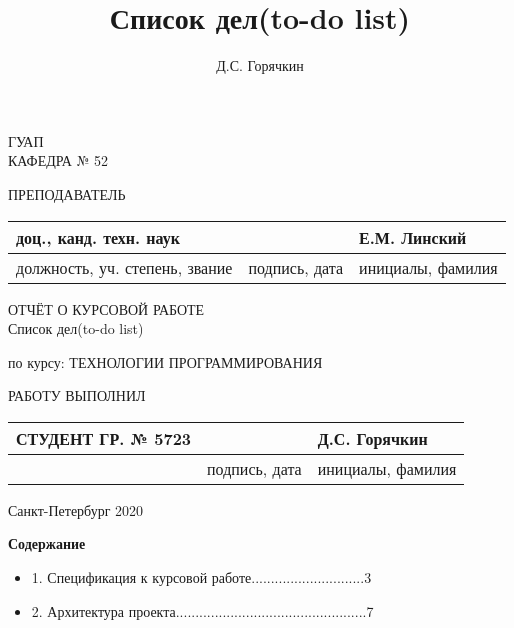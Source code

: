 \documentclass[a4paper,14pt]{extarticle} %
\author{Д.С. Горячкин}
\title{Список дел(to-do list)}
\begin{document}
 
\begin{titlepage} 
\begin{center} 

ГУАП\\ 
КАФЕДРА № 52\\ 
\vspace{2cm} 

\begin{flushleft} 
ПРЕПОДАВАТЕЛЬ 
\begin{tabular}{|l|l|l|} 
\hline 
доц., канд. техн. наук & & Е.М. Линский\\ 
\hline 
должность, уч. степень, звание & подпись, дата & инициалы, фамилия\\ 
\hline 
\end{tabular} 
\end{flushleft} 

\vspace{3cm} 

{\Large ОТЧЁТ О КУРСОВОЙ РАБОТЕ\\} 
\vspace{0.3cm} 
{\Large Список дел(to-do list)} 

\vspace{0.7cm} 

\begin{flushleft} 
по курсу: ТЕХНОЛОГИИ ПРОГРАММИРОВАНИЯ 
\end{flushleft} 

\vspace{5cm} 

\begin{flushleft} 
РАБОТУ ВЫПОЛНИЛ 
\begin{tabular}{|l|l|l|} 
\hline 
СТУДЕНТ ГР. № 5723 & & Д.С. Горячкин\\ 
\hline 
& подпись, дата & инициалы, фамилия\\ 
\hline 
\end{tabular} 
\end{flushleft} 

\vspace{2cm} 

Санкт-Петербург 2020

\end{center} 
\end{titlepage} 
\renewcommand{\chaptername}{Раздел} 
\renewcommand{\figurename}{Рисунок} 

\setcounter{page}{2} 
\large\bf {{Содержание}}
\begin{itemize}
    \item 1. Спецификация к курсовой работе.............................3
    \item 2. Архитектура проекта.................................................7
\end{itemize}
\end{document}
